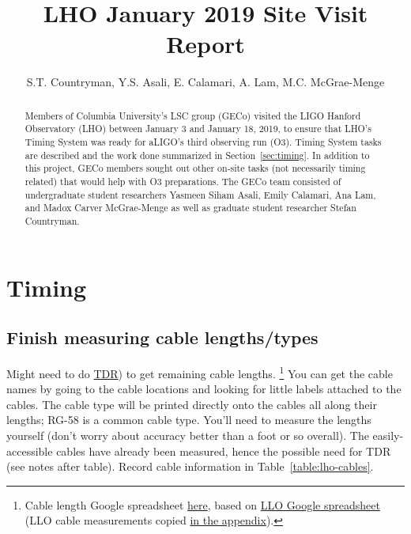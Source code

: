 \documentclass{article}
\author{S.T. Countryman, Y.S. Asali, E. Calamari, A. Lam, M.C. McGrae-Menge}
\title{LHO January 2019 Site Visit Report}
\begin{document}
\maketitle

\begin{abstract}
    Members of Columbia University's LSC group (GECo) visited the LIGO Hanford Observatory (LHO) between January 3 and January 18, 2019, to ensure that LHO's Timing System was ready for aLIGO's third observing run (O3). Timing System tasks are described and the work done summarized in Section~\ref{sec:timing}. In addition to this project, GECo members sought out other on-site tasks (not necessarily timing related) that would help with O3 preparations. The GECo team consisted of undergraduate student researchers Yasmeen Siham Asali, Emily Calamari, Ana Lam, and Madox Carver McGrae-Menge as well as graduate student researcher Stefan Countryman.
\end{abstract}

\section{\label{sec:timing}Timing}

\subsection{\label{sec:cable-lengths}Finish measuring cable lengths/types}

Might need to do 
\href{https://en.wikipedia.org/wiki/Time-domain_reflectometer}{TDR})
to get remaining cable lengths.
\footnote{
    Cable length Google spreadsheet \href{https://docs.google.com/spreadsheets/d/1cjpBtpd4oPAfjNjBhE3RXxSx3ma3oopqLLZFMjEjc0w/edit\#gid=0}{here}, based on \href{https://docs.google.com/spreadsheets/d/1AfZ9m7Qetefmtr-PnHNARC14OWaPfn0z5c9GOvcojyA/edit\#gid=0}{LLO Google spreadsheet} (LLO cable measurements copied \hyperref[sec:llocables]{in the appendix}).
}
You can get the cable names by going to the cable locations and looking for little labels attached to the cables. The cable type will be printed directly onto the cables all along their lengths; RG-58 is a common cable type. You'll need to measure the lengths yourself (don't worry about accuracy better than a foot or so overall). The easily-accessible cables have already been measured, hence the possible need for TDR (see notes after table).
Record cable information in Table~\ref{table:lho-cables}.
\end{document}
